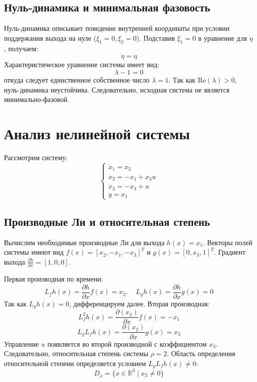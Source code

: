 \documentclass[a4paper,12pt]{article}
\begin{document}
\subsection{Нуль-динамика и минимальная фазовость}
Нуль-динамика описывает поведение внутренней координаты при условии поддержания выхода на нуле ($\xi_1 = 0, \xi_2 = 0$). Подставив $\xi_1=0$ в уравнение для $\dot{\eta}$, получаем:
$$ \dot{\eta} = \eta $$
Характеристическое уравнение системы имеет вид: $$\lambda - 1 = 0$$
откуда следует единственное собственное число $\lambda = 1$.
Так как $\text{Re}(\lambda) > 0$, нуль-динамика неустойчива. Следовательно, исходная система не является минимально-фазовой.

	
	
	
\newpage \section{Анализ нелинейной системы}

Рассмотрим систему:
\begin{equation}
	\begin{cases}
		\dot{x}_1 = x_2 \\
		\dot{x}_2 = -x_1 + x_3 u \\
		\dot{x}_3 = -x_3 + u \\
		y = x_1
	\end{cases}
\end{equation}

\subsection{Производные Ли и относительная степень}
Вычислим необходимые производные Ли для выхода $h(x)=x_1$. Векторы полей системы имеют вид $f(x)=[x_2, -x_1, -x_3]^T$ и $g(x)=[0, x_3, 1]^T$.
Градиент выхода $\frac{\partial h}{\partial x} = [1, 0, 0]$.

Первая производная по времени:
\[ L_f h(x) = \frac{\partial h}{\partial x} f(x) = x_2, \quad L_g h(x) = \frac{\partial h}{\partial x} g(x) = 0 \]
Так как $L_g h(x) = 0$, дифференцируем далее. Вторая производная:
\[ L_f^2 h(x) = \frac{\partial (x_2)}{\partial x} f(x) = -x_1 \]
\[ L_g L_f h(x) = \frac{\partial (x_2)}{\partial x} g(x) = x_3 \]
Управление $u$ появляется во второй производной с коэффициентом $x_3$. Следовательно, относительная степень системы $\rho=2$.
Область определения относительной степени определяется условием $L_g L_f h(x) \neq 0$:
\[ D_\rho = \{ x \in \mathbb{R}^3 \mid x_3 \neq 0 \} \]
\end{document}
